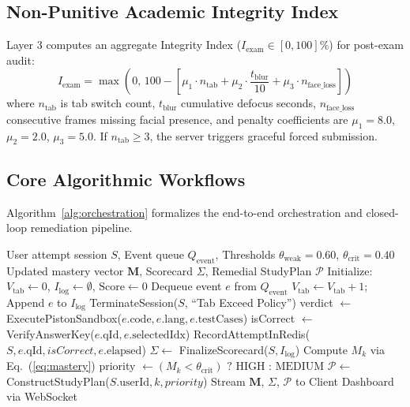 \documentclass[journal]{IEEEtran}
\begin{document}
\subsection{Non-Punitive Academic Integrity Index}
Layer 3 computes an aggregate Integrity Index ($I_{\text{exam}} \in [0, 100]\%$) for post-exam audit:
\begin{equation}
I_{\text{exam}} = \max\left(0, \, 100 - \left[ \mu_1 \cdot n_{\text{tab}} + \mu_2 \cdot \frac{t_{\text{blur}}}{10} + \mu_3 \cdot n_{\text{face\_loss}} \right] \right)
\label{eq:integrity_index}
\end{equation}
where $n_{\text{tab}}$ is tab switch count, $t_{\text{blur}}$ cumulative defocus seconds, $n_{\text{face\_loss}}$ consecutive frames missing facial presence, and penalty coefficients are $\mu_1 = 8.0$, $\mu_2 = 2.0$, $\mu_3 = 5.0$. If $n_{\text{tab}} \ge 3$, the server triggers graceful forced submission.

\subsection{Core Algorithmic Workflows}
Algorithm~\ref{alg:orchestration} formalizes the end-to-end orchestration and closed-loop remediation pipeline.

\begin{algorithm}[!t]
\caption{LearnHub End-to-End Orchestration \& Remediation Pipeline}
\label{alg:orchestration}
{\footnotesize
\begin{algorithmic}[1]
\REQUIRE User attempt session $S$, Event queue $Q_{\text{event}}$, Thresholds $\theta_{\text{weak}} = 0.60$, $\theta_{\text{crit}} = 0.40$
\ENSURE Updated mastery vector $\mathbf{M}$, Scorecard $\Sigma$, Remedial StudyPlan $\mathcal{P}$
\STATE Initialize: $V_{\text{tab}} \gets 0$, $I_{\text{log}} \gets \emptyset$, $\text{Score} \gets 0$
\STATE Dequeue event $e$ from $Q_{\text{event}}$
\STATE $V_{\text{tab}} \gets V_{\text{tab}} + 1$; Append $e$ to $I_{\text{log}}$
\STATE TerminateSession($S$, ``Tab Exceed Policy'')
\ENDIF
{}
\STATE verdict $\gets$ ExecutePistonSandbox($e.\text{code}, e.\text{lang}, e.\text{testCases}$)
\STATE isCorrect $\gets$ VerifyAnswerKey($e.\text{qId}, e.\text{selectedIdx}$)
\STATE RecordAttemptInRedis($S, e.\text{qId}, isCorrect, e.\text{elapsed}$)
\ENDIF
\ENDWHILE
\STATE $\Sigma \gets$ FinalizeScorecard($S, I_{\text{log}}$)
\STATE Compute $M_k$ via Eq.~(\ref{eq:mastery})
\STATE priority $\gets (M_k < \theta_{\text{crit}}) \textbf{ ? } \text{HIGH} \textbf{ : } \text{MEDIUM}$
\STATE $\mathcal{P} \gets$ ConstructStudyPlan($S.\text{userId}, k, priority$)
\ENDIF
\ENDFOR
\STATE Stream $\mathbf{M}$, $\Sigma$, $\mathcal{P}$ to Client Dashboard via WebSocket
\end{algorithmic}
}
\end{algorithm}
\end{document}
